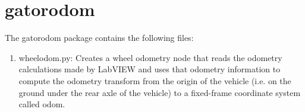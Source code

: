 \section{gator\textunderscore odom}

The gator\textunderscore odom package contains the following files:

\begin{enumerate}
\item wheel\textunderscore odom.py: Creates a wheel odometry node that reads the odometry calculations made by LabVIEW and uses that odometry information to compute the odometry transform from the origin of the vehicle (i.e. on the ground under the rear axle of the vehicle) to a fixed-frame coordinate system called odom. 
\end{enumerate}
